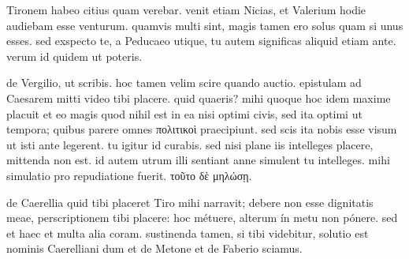 


 Tironem habeo citius quam verebar. venit etiam Nicias, et Valerium hodie audiebam esse venturum. quamvis multi sint, magis tamen ero solus quam si unus esses. sed exspecto te, a Peducaeo utique, tu autem significas aliquid etiam ante. verum id quidem ut poteris.

 de Vergilio, ut scribis. hoc tamen velim scire quando auctio. epistulam ad Caesarem mitti video tibi placere. quid quaeris? mihi quoque hoc idem maxime placuit et eo magis quod nihil est in ea nisi optimi civis, sed ita optimi ut tempora; quibus parere omnes πολιτικοὶ praecipiunt. sed scis ita nobis esse visum ut isti ante legerent. tu igitur id curabis. sed nisi plane iis intelleges placere, mittenda non est. id autem utrum illi sentiant anne simulent tu intelleges. mihi simulatio pro repudiatione fuerit. τοῦτο δὲ μηλώσῃ.

 de Caerellia quid tibi placeret Tiro mihi narravit; debere non esse dignitatis meae, perscriptionem tibi placere: hoc métuere, alterum ín metu non pónere. sed et haec et multa alia coram. sustinenda tamen, si tibi videbitur, solutio est nominis Caerelliani dum et de Metone et de Faberio sciamus.
